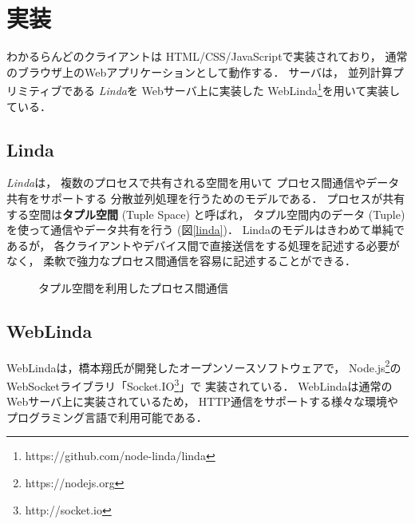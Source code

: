 \section{実装}

わかるらんどのクライアントは
HTML/CSS/JavaScriptで実装されており，
通常のブラウザ上のWebアプリケーションとして動作する．
%
サーバは，
並列計算プリミティブである
\textit{Linda}\cite{Carriero:1989:LC:63334.63337}を
Webサーバ上に実装した
WebLinda\footnote{https://github.com/node-linda/linda}を用いて実装している．

\subsection{Linda}

\textit{Linda}は，
複数のプロセスで共有される空間を用いて
プロセス間通信やデータ共有をサポートする
分散並列処理を行うためのモデルである．
プロセスが共有する空間は\textbf{タプル空間} (Tuple Space) と呼ばれ，
タプル空間内のデータ (Tuple) を使って通信やデータ共有を行う (図\ref{linda})．
Lindaのモデルはきわめて単純であるが，
各クライアントやデバイス間で直接送信をする処理を記述する必要がなく，
柔軟で強力なプロセス間通信を容易に記述することができる．

\begin{figure}[h]
\centering
{}
\caption{タプル空間を利用したプロセス間通信}
\label{button}
\end{figure}

\subsection{WebLinda}

WebLindaは，橋本翔氏が開発したオープンソースソフトウェアで，
Node.js\footnote{https://nodejs.org}の
WebSocketライブラリ「Socket.IO\footnote{http://socket.io}」で
実装されている．
WebLindaは通常のWebサーバ上に実装されているため，
HTTP通信をサポートする様々な環境やプログラミング言語で利用可能である．

